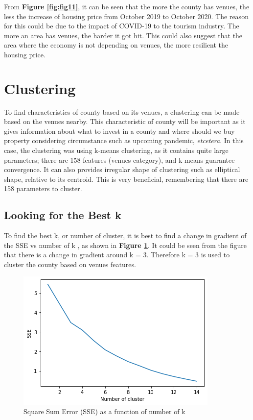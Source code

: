\documentclass{homeworg}
\begin{document}
\FloatBarrier
From \textbf{Figure \ref{fig:fig11}}, it can be seen that the more the county has venues, the less the increase of housing price from October 2019 to October 2020. The reason for this could be due to the impact of COVID-19 to the tourism industry. The more an area has venues, the harder it got hit. This could also suggest that the area where the economy is not depending on venues, the more resilient the housing price. 
\section{Clustering}
To find characteristics of county based on its venues, a clustering can be made based on the venues nearby. This characteristic of county will be important as it gives information about what to invest in a county and where should we buy property considering circumstance such as upcoming pandemic, \textit{etcetera}.
In this case, the clustering was using k-means clustering, as it contains quite large parameters; there are 158 features (venues category), and k-means guarantee convergence. It can also provides irregular shape of clustering such as elliptical shape, relative to its centroid. This is very beneficial, remembering that there are 158 parameters to cluster.
\subsection{Looking for the Best k}
To find the best k, or number of cluster, it is best to find a change in gradient of the SSE vs number of k , as shown in \textbf{Figure \ref{fig:fig12}}. It could be seen from the figure that there is a change in gradient around k = 3. Therefore k = 3 is used to cluster the county based on venues features.
\begin{figure}[!ht]
    \centering
    \includegraphics[scale=0.7]{figure/Figure_9_No_Cluster_VS_SSE.png}
    \caption{Square Sum Error (SSE) as a function of number of k}
    \label{fig:fig12}
\end{figure}
\FloatBarrier
\end{document}

